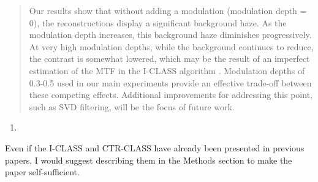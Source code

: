 \documentclass[12pt]{article}
\newcommand{\hlred}[1]{\sethlcolor{red!30}\hl{#1}}
\newenvironment{solved_reviewercomment}
    {\begin{tcolorbox}[width=\linewidth,colback=gray!5,colframe=solved_commentcolor!50,title=Reviewer Comment,left=5pt,right=5pt]}
    {\end{tcolorbox}}
\newenvironment{ourresponse}
    {\begin{tcolorbox}[width=\linewidth,breakable,enhanced,colback=gray!5,colframe=responsecolor!50,title=Response,left=5pt,right=5pt]}
    {\end{tcolorbox}}
\begin{document}
\begin{ourresponse}
\begin{quote}


Our results show that without adding a modulation (modulation depth = 0), the reconstructions display a significant background haze. As the modulation depth increases, this background haze diminishes progressively. At very high modulation depths, while the background continues to reduce, the contrast is somewhat lowered, which may be the result of an imperfect estimation of the MTF in the I-CLASS algorithm \cite{weinberg2024noninvasive}.  Modulation depths of 0.3-0.5 used in our main experiments provide an effective trade-off between these competing effects. 
Additional improvements for addressing this point, such as SVD filtering, will be the focus of future work.



\end{quote}
\end{ourresponse}


    
\begin{enumerate}[label=\arabic*., resume]
\item \leavevmode
\end{enumerate}
\vspace{-1em}
\begin{solved_reviewercomment}
    Even if the I-CLASS and CTR-CLASS have already been presented in previous papers, I would suggest describing them in the Methods section to make the paper self-sufficient. 
\end{solved_reviewercomment}
\end{document}
